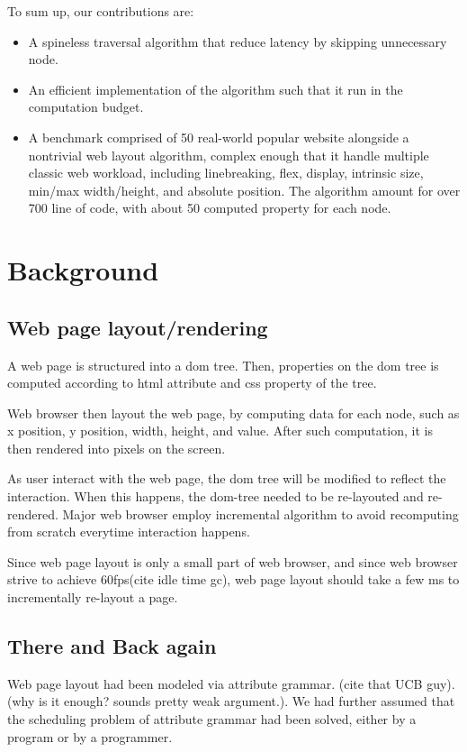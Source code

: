 \documentclass[format=acmsmall, review=false, screen=true]{acmart}
\begin{document}
To sum up, our contributions are:
\begin{itemize}
	\item A spineless traversal algorithm that reduce latency by skipping unnecessary node.
	\item An efficient implementation of the algorithm such that it run in the computation budget.
	\item A benchmark comprised of 50 real-world popular website alongside a nontrivial web layout algorithm, complex enough that it handle multiple classic web workload, including linebreaking, flex, display, intrinsic size, min/max width/height, and absolute position. The algorithm amount for over 700 line of code, with about 50 computed property for each node.
\end{itemize}
\section{Background}
\subsection{Web page layout/rendering}
A web page is structured into a dom tree. Then, properties on the dom tree is computed according to html attribute and css property of the tree.

Web browser then layout the web page, by computing data for each node, such as x position, y position, width, height, and value. After such computation, it is then rendered into pixels on the screen.

As user interact with the web page, the dom tree will be modified to reflect the interaction. When this happens, the dom-tree needed to be re-layouted and re-rendered. Major web browser employ incremental algorithm to avoid recomputing from scratch everytime interaction happens.

Since web page layout is only a small part of web browser, and since web browser strive to achieve 60fps(cite idle time gc), web page layout should take a few ms to incrementally re-layout a page.

\subsection{There and Back again}
Web page layout had been modeled via attribute grammar. (cite that UCB guy). (why is it enough? sounds pretty weak argument.). We had further assumed that the scheduling problem of attribute grammar had been solved, either by a program or by a programmer.
\end{document}
